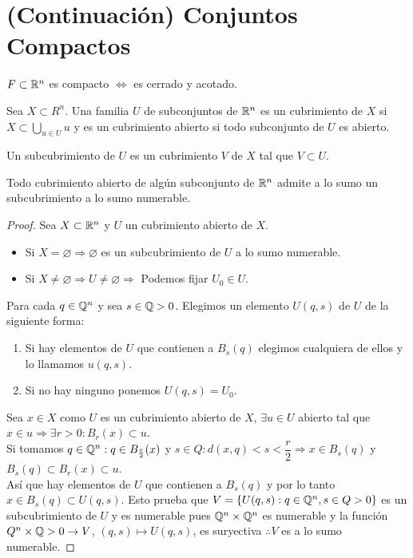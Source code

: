 \section{(Continuación) Conjuntos Compactos}

\begin{corollary}
  $F \subset \mathbb{R}^n$ es compacto $\iff$ es cerrado y acotado.
\end{corollary}

\begin{definition}[Cubrimiento]
  Sea $X \subset R^n$. Una familia $U$ de subconjuntos de $\mathbb{R}^n$ es un cubrimiento de $X$ si $X \subset \bigcup_{u \in U} u$ y es un cubrimiento abierto si todo subconjunto de $U$ es abierto.
\end{definition}

\begin{definition}[Subcubrimiento]
  Un subcubrimiento de $U$ es un cubrimiento $V$ de $X$ tal que $V \subset U$.
\end{definition}

\begin{theorem}[Lindelöf]
  Todo cubrimiento abierto de algún subconjunto de $\mathbb{R}^n$ admite a lo sumo un subcubrimiento a lo sumo numerable.
  \begin{proof}
    Sea $X \subset \mathbb{R}^n$ y $U$ un cubrimiento abierto de $X$.
    \begin{itemize}
      \item Si $X = \varnothing \Rightarrow \varnothing$ es un subcubrimiento de $U$ a lo
            sumo numerable.
      \item Si $X \neq \varnothing \Rightarrow U \neq \varnothing \Rightarrow$ Podemos
            fijar $U_0 \in U$.
    \end{itemize}
    Para cada $q \in \mathbb{Q}^n$ y sea $s \in \mathbb{Q} > 0$. Elegimos un elemento $U(q, s)$ de $U$ de la siguiente forma:
    \begin{enumerate}
      \item Si hay elementos de $U$ que contienen a $B_s(q)$ elegimos cualquiera de ellos y
            lo llamamos $u(q, s)$.
      \item Si no hay ninguno ponemos $U(q, s) = U_0$.
    \end{enumerate}
    Sea $x \in X$ como $U$ es un cubrimiento abierto de $X$, $\exists u \in U$ abierto tal que $x \in u \Rightarrow \exists r > 0 : B_r(x) \subset u$. \\
    Si tomamos $q \in \mathbb{Q}^n : q \in B_{\frac{r}{2}}(x)$ y $s \in Q : d(x, q) < s < \dfrac{r}{2} \Rightarrow x \in B_s(q)$ y $B_s(q) \subset B_r(x) \subset u$. \\
    Así que hay elementos de $U$ que contienen a $B_s(q)$ y por lo tanto $x \in B_s(q) \subset U(q, s)$. Esto prueba que $V = \{ U(q, s) : q \in \mathbb{Q}^n, s \in Q > 0 \}$ es un subcubrimiento de $U$ y es numerable pues $\mathbb{Q}^n \times \mathbb{Q}^n$ es numerable y la función $Q^n \times \mathbb{Q} > 0 \to V$, $(q, s) \mapsto U(q, s)$, es suryectiva $\therefore V$ es a lo sumo numerable.
  \end{proof}
\end{theorem}

